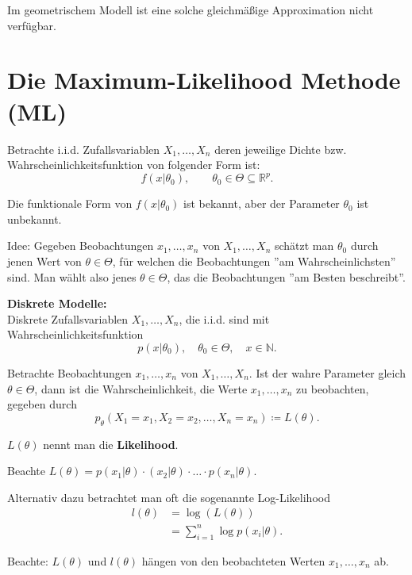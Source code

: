\documentclass{tstextbook}
\newcommand{\N}{\mathbb N}
\newcommand{\R}{\mathbb R}
\begin{document}
Im geometrischem Modell ist eine solche gleichmäßige Approximation nicht verfügbar.


\section{Die Maximum-Likelihood Methode (ML)}

Betrachte i.i.d. Zufallsvariablen $ X_1,\ldots,X_n $ deren jeweilige Dichte bzw. Wahrscheinlichkeitsfunktion von folgender Form ist: 
\[
f(x|\theta_0), \qquad \theta_0 \in \Theta \subseteq \R^p.
\]

Die funktionale Form von $ f(x|\theta_0) $ ist bekannt, aber der Parameter $ \theta_0 $ ist unbekannt. 

\begin{remark}
	Idee: Gegeben Beobachtungen $ x_1,\ldots,x_n $ von $ X_1,\ldots,X_n $ schätzt man $ \theta_0 $ durch jenen Wert von $ \theta\in\Theta $, für welchen die Beobachtungen ''am Wahrscheinlichsten'' sind. Man wählt also jenes $ \theta\in\Theta $, das die Beobachtungen ''am Besten beschreibt''. 
\end{remark}

	
\textbf{Diskrete Modelle:} \\

Diskrete Zufallsvariablen $ X_1,\ldots,X_n $, die i.i.d. sind mit Wahrscheinlichkeitsfunktion 
\[
p(x|\theta_0), \quad \theta_0\in\Theta, \quad x\in\N.
\]

Betrachte Beobachtungen $ x_1,\ldots,x_n $ von $ X_1,\ldots,X_n $. Ist der wahre Parameter gleich $ \theta\in\Theta $, dann ist die Wahrscheinlichkeit, die Werte $ x_1,\ldots,x_n $ zu beobachten, gegeben durch 
\[
p_\theta \left(X_1=x_1,X_2=x_2,\ldots,X_n=x_n\right) \coloneqq L(\theta).
\]

$ L(\theta) $ nennt man die \textbf{Likelihood}. 

Beachte $ L(\theta) = p(x_1|\theta)\cdotp(x_2|\theta)\cdot\ldots\cdot p(x_n|\theta) $.

Alternativ dazu betrachtet man oft die sogenannte Log-Likelihood
\[\begin{aligned}
	l(\theta) & = \log(L(\theta)) \\
	& = \sum_{i=1}^{n}\log p(x_i|\theta).
\end{aligned}
\]

\begin{remark}
	Beachte: $ L(\theta) $ und $ l(\theta) $ hängen von den beobachteten Werten $ x_1,\ldots,x_n $ ab.
\end{remark}
\end{document}

